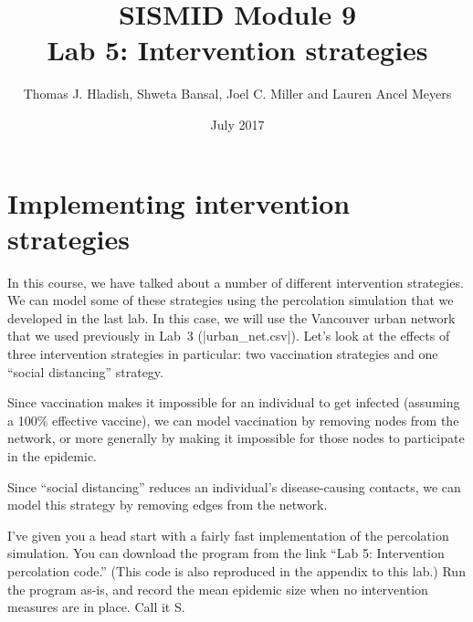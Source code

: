 \documentclass{article}
\begin{document}
\title{SISMID Module 9\\Lab 5: Intervention strategies}
\author{Thomas J. Hladish, Shweta Bansal, Joel C. Miller and Lauren Ancel Meyers}
\date{July 2017}
\maketitle


\section*{Implementing intervention strategies}

In this course, we have talked about a number of different intervention strategies. We can model some of these 
strategies using the percolation simulation that we developed in the last lab.  In this case, we will use
the Vancouver urban network that we used previously in Lab~3 (|urban_net.csv|).  Let's look at the effects of
three intervention strategies in particular: two vaccination strategies and one ``social distancing'' strategy.

Since vaccination makes it impossible for an individual to get infected (assuming a 100\% effective vaccine), we can
model vaccination by removing nodes from the network, or more generally by making it impossible for those nodes to participate in the epidemic.

Since ``social distancing'' reduces an individual's disease-causing contacts, we can model this strategy by
removing edges from the network.

I've given you a head start with a fairly fast implementation of the percolation simulation.  You can download the program 
from the link ``Lab 5: Intervention percolation code.''  (This code is also reproduced in the appendix to this lab.)  Run the program as-is,
and record the mean epidemic size when no intervention measures are in place.  Call it S.
\end{document}

